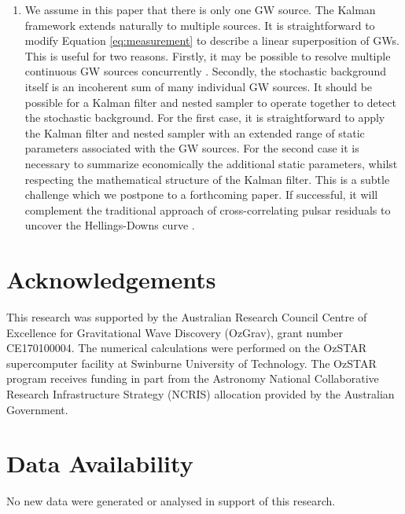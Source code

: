 \documentclass[fleqn,usenatbib,useAMS]{mnras}
\begin{document}
\begin{enumerate}[leftmargin=2em]
	
	\item We assume in this paper that there is only one GW source. The Kalman framework extends naturally to multiple sources. It is straightforward to modify Equation \eqref{eq:measurement} to describe a linear superposition of GWs. This is useful for two reasons. Firstly, it may be possible to resolve multiple continuous GW sources concurrently \citep{PhysRevD.85.044034}. Secondly, the stochastic background itself is an incoherent sum of many individual GW sources. It should be possible for a Kalman filter and nested sampler to operate together to detect the stochastic background. For the first case, it is straightforward to apply the Kalman filter and nested sampler with an extended range of static parameters associated with the GW sources. For the second case it is necessary to summarize economically the additional static parameters, whilst respecting the mathematical structure of the Kalman filter. This is a subtle challenge which we postpone to a forthcoming paper. If successful, it will complement the traditional approach of cross-correlating pulsar residuals to uncover the Hellings-Downs curve \citep{Hellings,2023ApJ...951L...8A}.
\end{enumerate}







\section*{Acknowledgements}
This research was supported by the Australian Research Council Centre of Excellence for Gravitational Wave Discovery (OzGrav), grant number CE170100004. The numerical calculations were performed on the OzSTAR supercomputer facility at Swinburne University of Technology. The OzSTAR program receives funding in part from the Astronomy National Collaborative Research Infrastructure Strategy (NCRIS) allocation provided by the Australian Government.


\section*{Data Availability}
No new data were generated or analysed in support of this research.






\appendix
\newpage
\newpage
\clearpage
\end{document}
